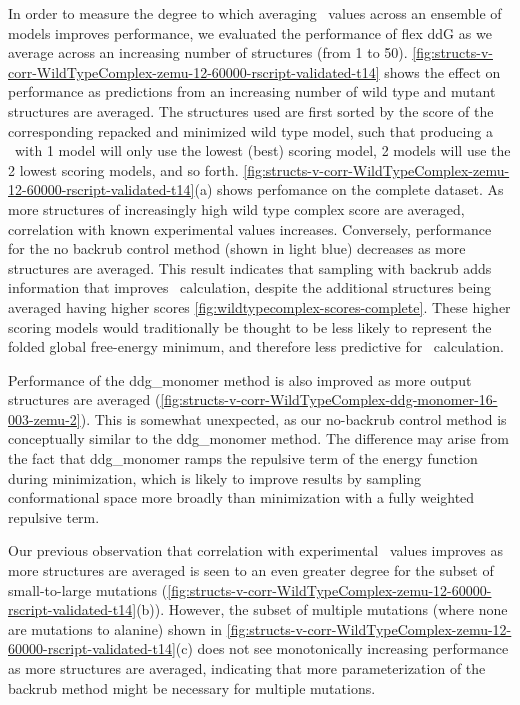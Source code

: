 In order to measure the degree to which averaging \ddg\ values across an ensemble of models improves performance, we evaluated the performance of flex ddG as we average across an increasing number of structures (from 1 to 50).
\cref{fig:structs-v-corr-WildTypeComplex-zemu-12-60000-rscript-validated-t14} shows the effect on performance as predictions from an increasing number of wild type and mutant structures are averaged.
The structures used are first sorted by the score of the corresponding repacked and minimized wild type model, such that producing a \ddg\ with 1 model will only use the lowest (best) scoring model, 2 models will use the 2 lowest scoring models, and so forth.
\cref{fig:structs-v-corr-WildTypeComplex-zemu-12-60000-rscript-validated-t14}(a) shows perfomance on the complete dataset.
As more structures of increasingly high wild type complex score are averaged, correlation with known experimental values increases.
Conversely, performance for the no backrub control method (shown in light blue) decreases as more structures are averaged.
This result indicates that sampling with backrub adds information that improves \ddg\ calculation, despite the additional structures being averaged having higher scores \cref{fig:wildtypecomplex-scores-complete}.
These higher scoring models would traditionally be thought to be less likely to represent the folded global free-energy minimum, and therefore less predictive for \ddg\ calculation.

Performance of the ddg\_monomer method is also improved as more output structures are averaged (\cref{fig:structs-v-corr-WildTypeComplex-ddg-monomer-16-003-zemu-2}).
This is somewhat unexpected, as our no-backrub control method is conceptually similar to the ddg\_monomer method.
The difference may arise from the fact that ddg\_monomer ramps the repulsive term of the energy function during minimization, which is likely to improve results by sampling conformational space more broadly than minimization with a fully weighted repulsive term.

Our previous observation that correlation with experimental \ddg\ values improves as more structures are averaged is seen to an even greater degree for the subset of small-to-large mutations (\cref{fig:structs-v-corr-WildTypeComplex-zemu-12-60000-rscript-validated-t14}(b)).
However, the subset of multiple mutations (where none are mutations to alanine) shown in \cref{fig:structs-v-corr-WildTypeComplex-zemu-12-60000-rscript-validated-t14}(c) does not see monotonically increasing performance as more structures are averaged, indicating that more parameterization of the backrub method might be necessary for multiple mutations.

